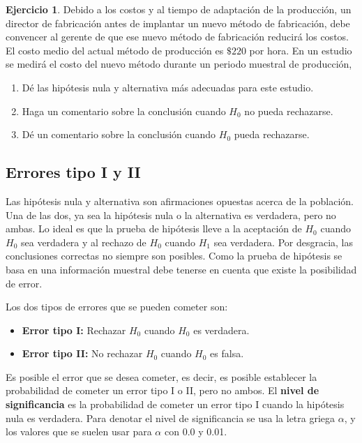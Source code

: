 \documentclass[
]{book}
\providecommand{\tightlist}{%
  \setlength{\itemsep}{0pt}\setlength{\parskip}{0pt}}
\theoremstyle{definition}
\theoremstyle{definition}
\theoremstyle{definition}
\newtheorem{exercise}{Ejercicio}[chapter]
\theoremstyle{definition}
\theoremstyle{remark}
\begin{document}
\begin{exercise}

Debido a los costos y al tiempo de adaptación de la producción, un director de fabricación antes de implantar un nuevo método de fabricación, debe convencer al gerente de que ese nuevo método de fabricación reducirá los costos. El costo medio del actual método de producción es \(\$220\) por hora. En un estudio se medirá el costo del nuevo método durante un periodo muestral de producción,

\begin{enumerate}
\def\labelenumi{\alph{enumi}.}
\tightlist
\item
  Dé las hipótesis nula y alternativa más adecuadas para este estudio.
\item
  Haga un comentario sobre la conclusión cuando \(H_0\) no pueda rechazarse.
\item
  Dé un comentario sobre la conclusión cuando \(H_0\) pueda rechazarse.
\end{enumerate}

\end{exercise}

\hypertarget{errores-tipo-i-y-ii}{%
\subsection{Errores tipo I y II}\label{errores-tipo-i-y-ii}}

Las hipótesis nula y alternativa son afirmaciones opuestas acerca de la población. Una de las dos, ya sea la hipótesis nula o la alternativa es verdadera, pero no ambas. Lo ideal es que la prueba de hipótesis lleve a la aceptación de \(H_0\) cuando \(H_0\) sea verdadera y al rechazo de \(H_0\) cuando \(H_1\) sea verdadera. Por desgracia, las conclusiones correctas no siempre son posibles. Como la prueba de hipótesis se basa en una información muestral debe tenerse en cuenta que existe la posibilidad de error.

Los dos tipos de errores que se pueden cometer son:

\begin{itemize}
\tightlist
\item
  \textbf{Error tipo I:} Rechazar \(H_0\) cuando \(H_0\) es verdadera.
\item
  \textbf{Error tipo II:} No rechazar \(H_0\) cuando \(H_0\) es falsa.
\end{itemize}

Es posible el error que se desea cometer, es decir, es posible establecer la probabilidad de cometer un error tipo I o II, pero no ambos. El \textbf{nivel de significancia} es la probabilidad de cometer un error tipo I cuando la hipótesis nula es verdadera. Para denotar el nivel de significancia se usa la letra griega \(\alpha\), y los valores que se suelen usar para \(\alpha\) con 0.0 y 0.01.
\end{document}
